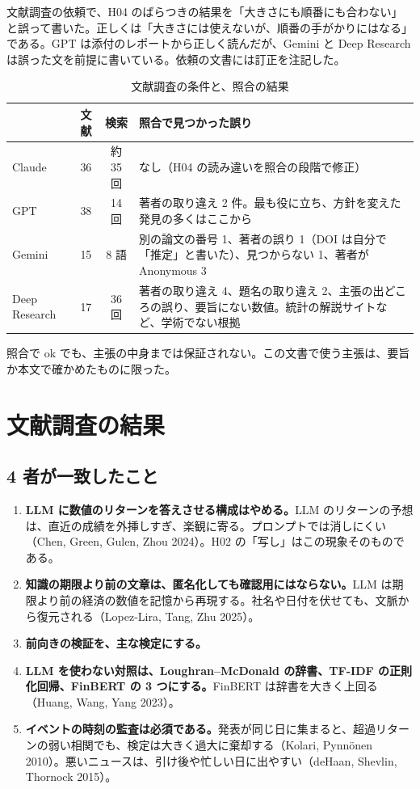 \documentclass[xelatex,ja=standard,jafont=haranoaji,a4paper,10pt]{bxjsarticle}
\begin{document}
\begin{notebox}[依頼の文書の誤り]
文献調査の依頼で、H04 のばらつきの結果を「大きさにも順番にも合わない」と誤って書いた。正しくは「大きさには使えないが、順番の手がかりにはなる」である。GPT は添付のレポートから正しく読んだが、Gemini と Deep Research は誤った文を前提に書いている。依頼の文書には訂正を注記した。
\end{notebox}

\begin{table}[h]\centering\small
\caption{文献調査の条件と、照合の結果}
\begin{tabularx}{\linewidth}{@{}l c c L@{}}
\toprule
 & 文献 & 検索 & 照合で見つかった誤り \\
\midrule
Claude & 36 & 約 35 回 & なし（H04 の読み違いを照合の段階で修正） \\
GPT & 38 & 14 回 & 著者の取り違え 2 件。最も役に立ち、方針を変えた発見の多くはここから \\
Gemini & 15 & 8 語 & 別の論文の番号 1、著者の誤り 1（DOI は自分で「推定」と書いた）、見つからない 1、著者が Anonymous 3 \\
Deep Research & 17 & 36 回 & 著者の取り違え 4、題名の取り違え 2、主張の出どころの誤り、要旨にない数値。統計の解説サイトなど、学術でない根拠 \\
\bottomrule
\end{tabularx}
\end{table}

照合で ok でも、主張の中身までは保証されない。この文書で使う主張は、要旨か本文で確かめたものに限った。

\section{文献調査の結果}

\subsection{4 者が一致したこと}
\begin{enumerate}
\item \textbf{LLM に数値のリターンを答えさせる構成はやめる。}LLM のリターンの予想は、直近の成績を外挿しすぎ、楽観に寄る。プロンプトでは消しにくい（Chen, Green, Gulen, Zhou 2024）。H02 の「写し」はこの現象そのものである。
\item \textbf{知識の期限より前の文章は、匿名化しても確認用にはならない。}LLM は期限より前の経済の数値を記憶から再現する。社名や日付を伏せても、文脈から復元される（Lopez-Lira, Tang, Zhu 2025）。
\item \textbf{前向きの検証を、主な検定にする。}
\item \textbf{LLM を使わない対照は、Loughran--McDonald の辞書、TF-IDF の正則化回帰、FinBERT の 3 つにする。}FinBERT は辞書を大きく上回る（Huang, Wang, Yang 2023）。
\item \textbf{イベントの時刻の監査は必須である。}発表が同じ日に集まると、超過リターンの弱い相関でも、検定は大きく過大に棄却する（Kolari, Pynnönen 2010）。悪いニュースは、引け後や忙しい日に出やすい（deHaan, Shevlin, Thornock 2015）。
\end{enumerate}
\end{document}
